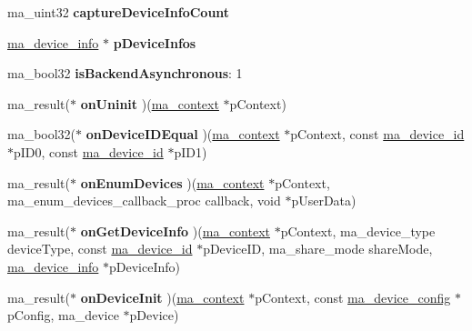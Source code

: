 \begin{DoxyCompactItemize}
ma\+\_\+uint32 {\bfseries capture\+Device\+Info\+Count}
\item 
\mbox{\label{structma__context_a54823354a5ec90fa5991f5f2e67ff1f6}} 
\mbox{\hyperlink{structma__device__info}{ma\+\_\+device\+\_\+info}} $\ast$ {\bfseries p\+Device\+Infos}
\item 
\mbox{\label{structma__context_a69bd00e692d0d19d679d41b822dfef52}} 
ma\+\_\+bool32 {\bfseries is\+Backend\+Asynchronous}\+: 1
\item 
\mbox{\label{structma__context_a3ccf63f362b13e9b4ec73215770c2e0e}} 
ma\+\_\+result($\ast$ {\bfseries on\+Uninit} )(\mbox{\hyperlink{structma__context}{ma\+\_\+context}} $\ast$p\+Context)
\item 
\mbox{\label{structma__context_aaf555d51d3d2b6e5c554e7fea8766ca7}} 
ma\+\_\+bool32($\ast$ {\bfseries on\+Device\+I\+D\+Equal} )(\mbox{\hyperlink{structma__context}{ma\+\_\+context}} $\ast$p\+Context, const \mbox{\hyperlink{unionma__device__id}{ma\+\_\+device\+\_\+id}} $\ast$p\+I\+D0, const \mbox{\hyperlink{unionma__device__id}{ma\+\_\+device\+\_\+id}} $\ast$p\+I\+D1)
\item 
\mbox{\label{structma__context_aceaf4968176b5b14c1e95a014991f490}} 
ma\+\_\+result($\ast$ {\bfseries on\+Enum\+Devices} )(\mbox{\hyperlink{structma__context}{ma\+\_\+context}} $\ast$p\+Context, ma\+\_\+enum\+\_\+devices\+\_\+callback\+\_\+proc callback, void $\ast$p\+User\+Data)
\item 
\mbox{\label{structma__context_a514793d989ea3fae4e676674363953fd}} 
ma\+\_\+result($\ast$ {\bfseries on\+Get\+Device\+Info} )(\mbox{\hyperlink{structma__context}{ma\+\_\+context}} $\ast$p\+Context, ma\+\_\+device\+\_\+type device\+Type, const \mbox{\hyperlink{unionma__device__id}{ma\+\_\+device\+\_\+id}} $\ast$p\+Device\+ID, ma\+\_\+share\+\_\+mode share\+Mode, \mbox{\hyperlink{structma__device__info}{ma\+\_\+device\+\_\+info}} $\ast$p\+Device\+Info)
\item 
\mbox{\label{structma__context_a7d60f4f81b8e51bca2452fb2457e659b}} 
ma\+\_\+result($\ast$ {\bfseries on\+Device\+Init} )(\mbox{\hyperlink{structma__context}{ma\+\_\+context}} $\ast$p\+Context, const \mbox{\hyperlink{structma__device__config}{ma\+\_\+device\+\_\+config}} $\ast$p\+Config, ma\+\_\+device $\ast$p\+Device)

\end{DoxyCompactItemize}
